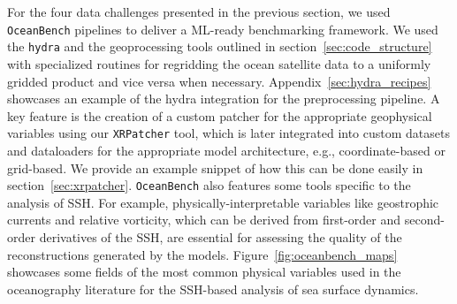 For the four data challenges presented in the previous section, we used \texttt{OceanBench} pipelines to deliver a ML-ready benchmarking framework.
We used the \texttt{hydra} and the geoprocessing tools outlined in section~\ref{sec:code_structure} with specialized routines for regridding the ocean satellite data to a uniformly gridded product and vice versa when necessary. 
Appendix~\ref{sec:hydra_recipes} showcases an example of the hydra integration for the preprocessing pipeline. 
A key feature is the creation of a custom patcher for the appropriate geophysical variables using our \texttt{XRPatcher} tool, which is later integrated into custom datasets and dataloaders for the appropriate model architecture, e.g., coordinate-based or grid-based. 
We provide an example snippet of how this can be done easily in section~\ref{sec:xrpatcher}.
\texttt{OceanBench} also features some tools specific to the analysis of SSH. 
For example, physically-interpretable variables like geostrophic currents and relative vorticity, which can be derived from first-order and second-order derivatives of the SSH, are essential for assessing the quality of the reconstructions generated by the models. 
Figure~\ref{fig:oceanbench_maps} showcases some fields of the most common physical variables used in the oceanography literature for the SSH-based analysis of sea surface dynamics.



% 


